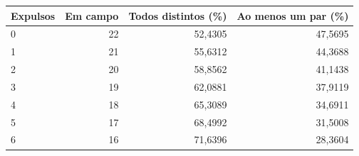 \begin{tabular}{lrrr}
\toprule
Expulsos & Em campo & Todos distintos (\%) & Ao menos um par (\%) \\
\midrule
0 & 22 & 52,4305 & 47,5695 \\
1 & 21 & 55,6312 & 44,3688 \\
2 & 20 & 58,8562 & 41,1438 \\
3 & 19 & 62,0881 & 37,9119 \\
4 & 18 & 65,3089 & 34,6911 \\
5 & 17 & 68,4992 & 31,5008 \\
6 & 16 & 71,6396 & 28,3604 \\
\bottomrule
\end{tabular}
